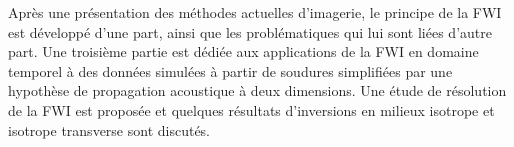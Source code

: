 Après une présentation des méthodes actuelles d'imagerie, le principe de la FWI est développé d'une part, ainsi que les problématiques qui lui sont liées d'autre part.
Une troisième partie est dédiée aux applications de la FWI en domaine temporel à des données simulées à partir de soudures simplifiées par une hypothèse de propagation acoustique à deux dimensions. Une étude de résolution de la FWI est proposée et quelques résultats d'inversions en milieux isotrope et isotrope transverse sont discutés.









%
%
%
%
%
%
